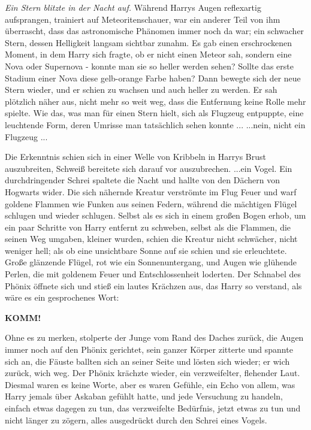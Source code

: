 \emph{Ein Stern blitzte in der Nacht auf.}
Während Harrys Augen reflexartig aufsprangen, trainiert auf Meteoritenschauer,
war ein anderer Teil von ihm überrascht, dass das astronomische Phänomen immer
noch da war; ein schwacher Stern, dessen Helligkeit langsam sichtbar zunahm. Es
gab einen erschrockenen Moment, in dem Harry sich fragte, ob er nicht einen
Meteor sah, sondern eine Nova oder Supernova - konnte man sie so heller werden
sehen? Sollte das erste Stadium einer Nova diese gelb-orange Farbe haben? Dann
bewegte sich der neue Stern wieder, und er schien zu wachsen und auch heller zu
werden. Er sah plötzlich näher aus, nicht mehr so weit weg, dass die Entfernung
keine Rolle mehr spielte. Wie das, was man für einen Stern hielt, sich als
Flugzeug entpuppte, eine leuchtende Form, deren Umrisse man tatsächlich sehen
konnte ... ...nein, nicht ein Flugzeug ...

Die Erkenntnis schien sich in einer Welle von Kribbeln in Harrys Brust
auszubreiten, Schweiß bereitete sich darauf vor auszubrechen. ...ein Vogel. Ein
durchdringender Schrei spaltete die Nacht und hallte von den Dächern von
Hogwarts wider. Die sich nähernde Kreatur verströmte im Flug Feuer und warf
goldene Flammen wie Funken aus seinen Federn, während die mächtigen Flügel
schlugen und wieder schlugen. Selbst als es sich in einem großen Bogen erhob, um
ein paar Schritte von Harry entfernt zu schweben, selbst als die Flammen, die
seinen Weg umgaben, kleiner wurden, schien die Kreatur nicht schwächer, nicht
weniger hell; als ob eine unsichtbare Sonne auf sie schien und sie erleuchtete.
Große glänzende Flügel, rot wie ein Sonnenuntergang, und Augen wie glühende
Perlen, die mit goldenem Feuer und Entschlossenheit loderten. Der Schnabel des
Phönix öffnete sich und stieß ein lautes Krächzen aus, das Harry so verstand,
als wäre es ein gesprochenes Wort:

\textbf{KOMM!}

Ohne es zu merken, stolperte der Junge vom Rand des Daches zurück, die Augen
immer noch auf den Phönix gerichtet, sein ganzer Körper zitterte und spannte
sich an, die Fäuste ballten sich an seiner Seite und lösten sich wieder; er wich
zurück, wich weg. Der Phönix krächzte wieder, ein verzweifelter, flehender Laut.
Diesmal waren es keine Worte, aber es waren Gefühle, ein Echo von allem, was
Harry jemals über Askaban gefühlt hatte, und jede Versuchung zu handeln, einfach
etwas dagegen zu tun, das verzweifelte Bedürfnis, jetzt etwas zu tun und nicht
länger zu zögern, alles ausgedrückt durch den Schrei eines Vogels.

